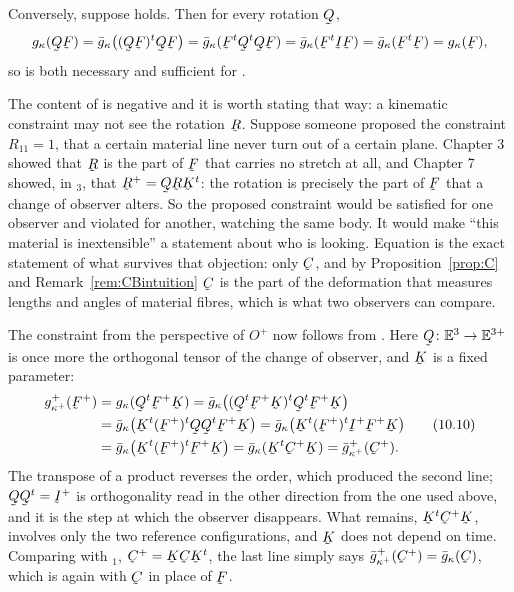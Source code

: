 Conversely, suppose  holds. Then for every rotation $\bQ$,
\[
   g_{\kappa}(\bQ\bF)=\bar g_{\kappa}\big((\bQ\bF)^{t}\bQ\bF\big)
   =\bar g_{\kappa}(\bF^{t}\bQ^{t}\bQ\bF)
   =\bar g_{\kappa}(\bF^{t}\I\bF)=\bar g_{\kappa}(\bF^{t}\bF)
   =g_{\kappa}(\bF),
\]
so  is both necessary and sufficient for .

\begin{remark}\label{rem:ch10rotblind}
The content of  is negative and it is worth stating that way: a
kinematic constraint may not see the rotation $\bR$. Suppose someone
proposed the constraint $R_{11}=1$, that a certain material line never
turn out of a certain plane. Chapter 3 showed that $\bR$ is the part of
$\bF$ that carries no stretch at all, and Chapter 7 showed, in
$_{3}$, that $\bR^{+}=\bQ\bR\bK^{t}$: the rotation is precisely
the part of $\bF$ that a change of observer alters. So the proposed
constraint would be satisfied for one observer and violated for another,
watching the same body. It would make ``this material is inextensible''
a statement about who is looking. Equation  is the exact
statement of what survives that objection: only $\bC$, and by
Proposition~\ref{prop:C} and Remark~\ref{rem:CBintuition} $\bC$ is the
part of the deformation that measures lengths and angles of material
fibres, which is what two observers can compare.
\end{remark}

The constraint from the perspective of $O^{+}$ now follows from
. Here $\bQ\colon\Vt\to\mathbb{E}^{3+}$ is once more the
orthogonal tensor of the change of observer, and $\bK$ is a fixed
parameter:
\begin{equation}
\begin{aligned}
   g^{+}_{\kappa^{+}}(\bF^{+})
   &=g_{\kappa}(\bQ^{t}\bF^{+}\bK)
    =\bar g_{\kappa}\big((\bQ^{t}\bF^{+}\bK)^{t}\bQ^{t}\bF^{+}\bK\big)\\
   &=\bar g_{\kappa}\big(\bK^{t}(\bF^{+})^{t}\bQ\bQ^{t}\bF^{+}\bK\big)
    =\bar g_{\kappa}\big(\bK^{t}(\bF^{+})^{t}\I^{+}\bF^{+}\bK\big)\\
   &=\bar g_{\kappa}\big(\bK^{t}(\bF^{+})^{t}\bF^{+}\bK\big)
    =\bar g_{\kappa}(\bK^{t}\bC^{+}\bK)
    =\bar g^{+}_{\kappa^{+}}(\bC^{+}) .
\end{aligned}
   \tag{10.10}\label{eq:10.10}
\end{equation}
The transpose of a product reverses the order, which produced the second
line; $\bQ\bQ^{t}=\I^{+}$ is orthogonality read in the other direction
from the one used above, and it is the step at which the observer
disappears. What remains, $\bK^{t}\bC^{+}\bK$, involves only the two
reference configurations, and $\bK$ does not depend on time. Comparing
with $_{1}$, $\bC^{+}=\bK\bC\bK^{t}$, the last line simply says
$\bar g^{+}_{\kappa^{+}}(\bC^{+})=\bar g_{\kappa}(\bC)$, which is
 again with $\bC$ in place of $\bF$.

